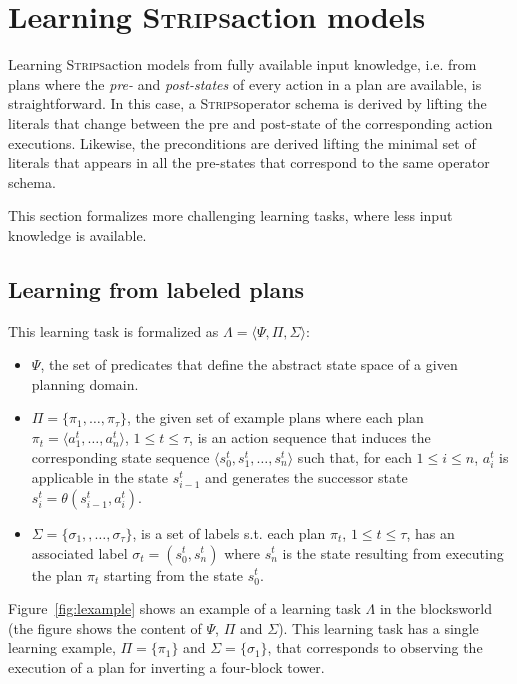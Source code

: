 \documentclass[letterpaper]{article} %
\newcommand{\tup}[1]{{\langle #1 \rangle}}
\newcommand{\strips}{\textsc{Strips}}     %
\begin{document}
\section{Learning \strips action models}
Learning \strips action models from fully available input knowledge, i.e. from plans where the {\em pre-} and {\em post-states} of every action in a plan are available, is straightforward. In this case, a \strips operator schema is derived by lifting the literals that change between the pre and post-state of the corresponding action executions. Likewise, the preconditions are derived lifting the minimal set of literals that appears in all the pre-states that correspond to the same operator schema.

This section formalizes more challenging learning tasks, where less input knowledge is available.

\subsection{Learning from labeled plans}
This learning task is formalized as $\Lambda=\tup{\Psi,\Pi,\Sigma}$:
\begin{itemize}
\item $\Psi$, the set of predicates that define the abstract state space of a given planning domain.
\item $\Pi=\{\pi_1,\ldots,\pi_{\tau}\}$, the given set of example plans where each plan $\pi_t=\tup{a_1^t, \ldots, a_n^t}$, {\small $1\leq t\leq \tau$}, is an action sequence that induces the corresponding state sequence $\tup{s_0^t, s_1^t, \ldots, s_n^t}$ such that, for each {\small $1\leq i\leq n$}, $a_i^t$ is applicable in the state $s_{i-1}^t$ and generates the successor state $s_i^t=\theta(s_{i-1}^t,a_i^t)$.
\item $\Sigma=\{\sigma_1,,\ldots,\sigma_{\tau}\}$, is a set of labels s.t. each plan $\pi_t$, {\small $1\leq t\leq \tau$}, has an associated label $\sigma_t=(s_0^t,s_{n}^t)$ where $s_{n}^t$ is the state resulting from executing the plan $\pi_t$ starting from the state $s_0^t$.
\end{itemize}

Figure~\ref{fig:lexample} shows an example of a learning task $\Lambda$ in the blocksworld (the figure shows the content of $\Psi$, $\Pi$ and $\Sigma$). This learning task has a single learning example, $\Pi=\{\pi_1\}$ and $\Sigma=\{\sigma_1\}$, that corresponds to observing the execution of a plan for inverting a four-block tower.
\end{document}
